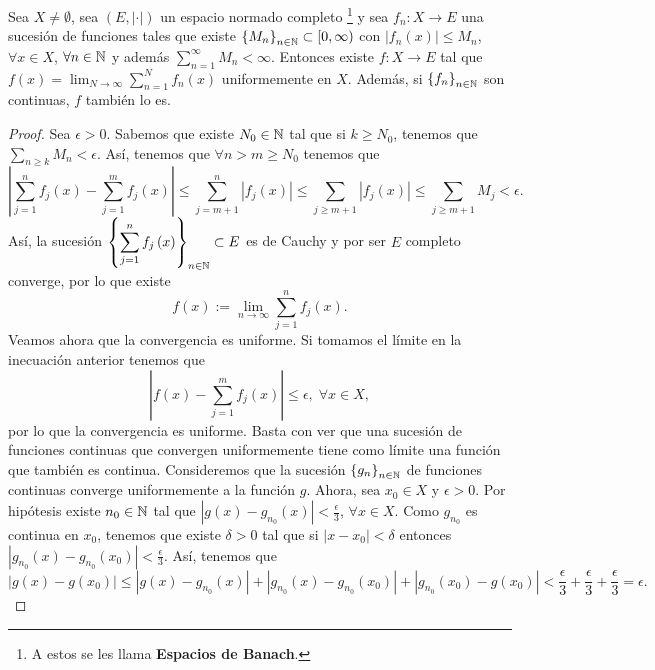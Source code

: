 \begin{theorem}
	Sea $\displaystyle X \neq \emptyset $, sea $\displaystyle \left(E, \left| \cdot \right|\right) $ un espacio normado completo \footnote{A estos se les llama \textbf{Espacios de Banach}.} y sea $\displaystyle f_{n} : X \to E $ una sucesión de funciones tales que existe $\displaystyle \left\{ M_{n}\right\} _{n\in\mathbb{N}}\subset[0,\infty) $ con $\displaystyle \left|f_{n}\left(x\right)\right|\leq M_{n} $, $\displaystyle \forall x \in X $, $\displaystyle \forall n \in \mathbb{N} $ y además $\displaystyle \sum^{\infty}_{n = 1}M_{n}<\infty  $. 
	Entonces existe $\displaystyle f : X \to E $ tal que $\displaystyle f\left(x\right)=\lim_{N \to \infty}\sum^{N}_{n = 1}f_{n}\left(x\right) $ uniformemente en $\displaystyle X $. Además, si $\displaystyle \left\{ f_{n}\right\} _{n\in\mathbb{N}} $ son continuas, $\displaystyle f $ también lo es.
\end{theorem}
\begin{proof}
Sea $\displaystyle \epsilon > 0 $. Sabemos que existe $\displaystyle N_{0} \in \mathbb{N} $ tal que si $\displaystyle k \geq N_{0} $, tenemos que $\displaystyle \sum_{n \geq k}M_{n}<\epsilon  $. Así, tenemos que $\displaystyle \forall n > m \geq N_{0} $ tenemos que 
\[ \left|\sum^{n}_{j = 1}f_{j}\left(x\right)-\sum^{m}_{j = 1}f_{j}\left(x\right)\right| \leq \sum^{n}_{j = m + 1} \left|f_{j}\left(x\right)\right| \leq \sum_{j \geq m + 1} \left|f_{j}\left(x\right)\right| \leq \sum_{j \geq m + 1}M_{j}<\epsilon .\]
Así, la sucesión $\displaystyle \left\{ \sum^{n}_{j = 1}f_{j}\left(x\right)\right\} _{n\in\mathbb{N}}\subset E $ es de Cauchy y por ser $\displaystyle E $ completo converge, por lo que existe
\[f\left(x\right):=\lim_{n \to \infty}\sum^{n}_{j = 1}f_{j}\left(x\right) .\]
Veamos ahora que la convergencia es uniforme. Si tomamos el límite en la inecuación anterior tenemos que 
\[ \left|f\left(x\right)-\sum^{m}_{j = 1}f_{j}\left(x\right)\right| \leq \epsilon, \; \forall x \in X  ,\]
por lo que la convergencia es uniforme.
Basta con ver que una sucesión de funciones continuas que convergen uniformemente tiene como límite una función que también es continua. Consideremos que la sucesión $\displaystyle \left\{ g_{n}\right\} _{n\in\mathbb{N}} $ de funciones continuas converge uniformemente a la función $\displaystyle g $. Ahora, sea $\displaystyle x_{0} \in X $ y $\displaystyle \epsilon > 0 $. Por hipótesis existe $\displaystyle n_{0}\in \mathbb{N} $ tal que $\displaystyle \left|g\left(x\right)-g_{n_{0}}\left(x\right)\right|<\frac{\epsilon }{3} $, $\displaystyle \forall x \in X $. 
Como $\displaystyle g_{n_{0}} $ es continua en $\displaystyle x_{0} $, tenemos que existe $\displaystyle \delta > 0 $ tal que si $\displaystyle \left|x - x_{0}\right| < \delta  $ entonces $\displaystyle \left|g_{n_{0}}\left(x\right)-g_{n_{0}}\left(x_{0}\right)\right|<\frac{\epsilon }{3} $. Así, tenemos que 
\[ \left|g\left(x\right)-g\left(x_{0}\right)\right|\leq \left|g\left(x\right)-g_{n_{0}}\left(x\right)\right| + \left|g_{n_{0}}\left(x\right)-g_{n_{0}}\left(x_{0}\right)\right|+ \left|g_{n_{0}}\left(x_{0}\right)-g\left(x_{0}\right)\right| < \frac{\epsilon }{3} + \frac{\epsilon }{3} + \frac{\epsilon }{3}=\epsilon  .\]
\end{proof}
